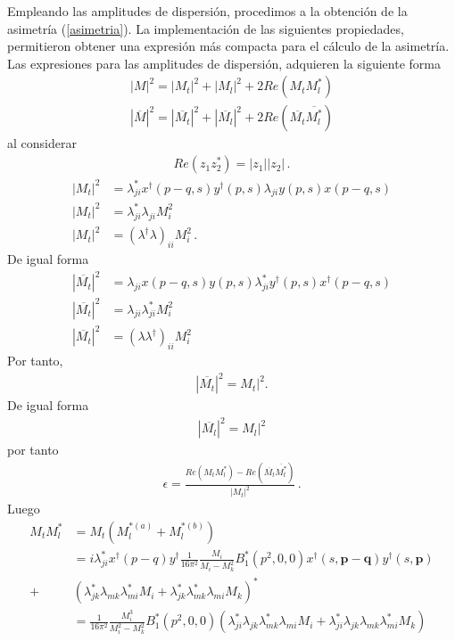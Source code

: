 Empleando las amplitudes de dispersión, procedimos a la obtención de la asimetría (\ref{asimetria}). La implementación de las siguientes propiedades, permitieron obtener una expresión más compacta para el cálculo de la asimetría.
Las expresiones para las amplitudes de dispersión, adquieren la siguiente forma
\begin{align}
|M|^2=|M_{t}|^2+|M_{l}|^2+2Re(M_{t}M^*_{l})\nonumber \\
|\overline{M}|^2=|\overline{M_{t}}|^2+|\overline{M_{l}}|^2+2Re(\overline{M_{t}} \overline{M^*_{l}})
\end{align}
al considerar
\begin{align}
Re(z_{1}z^*_{2})=|z_{1}||z_{2}|\, .
\end{align}
\begin{align}
\label{92}
|M_{t}|^2&=\lambda^*_{ji}x^{\dagger}(p-q,s)y^{\dagger}(p,s)\lambda_{ji}y(p,s)x(p-q,s)\nonumber\\
|M_{t}|^2&=\lambda^*_{ji}\lambda_{ji}M_{i}^2\nonumber\\
|M_{t}|^2&=(\lambda^{\dagger}\lambda)_{ii}M_{i}^2\, . 
\end{align}
De igual forma 
\begin{align}
|\overline{M_{t}}|^2&=\lambda_{ji}x(p-q,s)y(p,s)\lambda^*_{ji}y^{\dagger}(p,s)x^{\dagger}(p-q,s)\nonumber\\
|\overline{M_{t}}|^2&=\lambda_{ji}\lambda^*_{ji}M_{i}^2\nonumber\\
|\overline{M_{t}}|^2&=(\lambda\lambda^{\dagger})_{ii}M_{i}^2
\end{align}
Por tanto, 
\begin{align*}
|\overline{M_{t}}|^2=M_{t}|^2. 
\end{align*}
De igual forma
\begin{align*}
|\overline{M_{l}}|^2=M_{l}|^2
\end{align*}
por tanto
\begin{align}
\epsilon=\frac{Re(M_{t}M^*_{l})-Re(\overline{M_{t}} \overline{M^*_{t}})}{|M_{t}|^2}\, .
\end{align}
Luego 
\begin{align}
M_{t}M^*_{l}&=M_{t}(M^{*(a)}_{l}+M^{*(b)}_{l})\\
&=i\lambda^*_{ji}x^{\dagger}(p-q)y^{\dagger}\frac{1}{16\pi^2}
\frac{M_{i}}{M_{i}-M_{k}^2}B_{1}^*(p^2,0,0)x^\dagger(s,\boldsymbol{p-q})y^\dagger(s,\boldsymbol{p})\\ \nonumber+&
(\lambda^*_{jk}\lambda_{mk}\lambda^*_{mi}M_{i}+\lambda^*_{jk}\lambda^*_{mk}\lambda_{mi}M_{k})^*\\ \nonumber &
=\frac{1}{16\pi^2}
\frac{M_{i}^3}{M_{i}^2-M_{k}^2}B_{1}^*(p^2,0,0)(\lambda^*_{ji}\lambda_{jk}\lambda^*_{mk}\lambda_{mi}M_{i}+\lambda^*_{ji}\lambda_{jk}\lambda_{mk}\lambda^*_{mi}M_{k})
\end{align}
